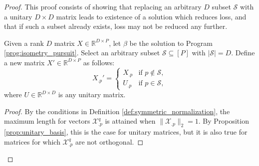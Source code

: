  \begin{proof}
 

This proof consists of showing that replacing an arbitrary $D$ subset $\mathcal S$ with a unitary $D \times D$ matrix leads to existence of a solution which reduces loss, and that if such a subset already exists, loss may not be reduced any further.

\begin{proposition}
Given a rank $D$ matrix $X \in \mathbb{R}^{D \times P}$, let $\beta$ be the solution to Program \ref{prog:isometry_pursuit}.
Select an arbitrary subset $\mathcal{S} \subseteq [P]$ with $|\mathcal{S}| = D$.
Define a new matrix $X' \in \mathbb{R}^{D \times P}$ as follows:
\[
X_{.p}' = \begin{cases} 
X_{.p} & \text{if } p \notin \mathcal{S}, \\
U_{.p} & \text{if } p \in \mathcal{S},
\end{cases}
\]
where $U \in \mathbb{R}^{D \times D}$ is any unitary matrix.
\end{proposition}

\begin{proof}
By the conditions in Definition  \ref{def:symmetric_normalization}, the maximum length for vectors $\mathcal X^q_{.p}$ is attained when $\|\mathcal X_{.p}\|_2 = 1$.
By Proposition \ref{prop:unitary_basis}, this is the case for unitary matrices, but it is also true for matrices for which $\mathcal X^q_{.p}$ are not orthogonal.


\end{proof}
\end{proof}
